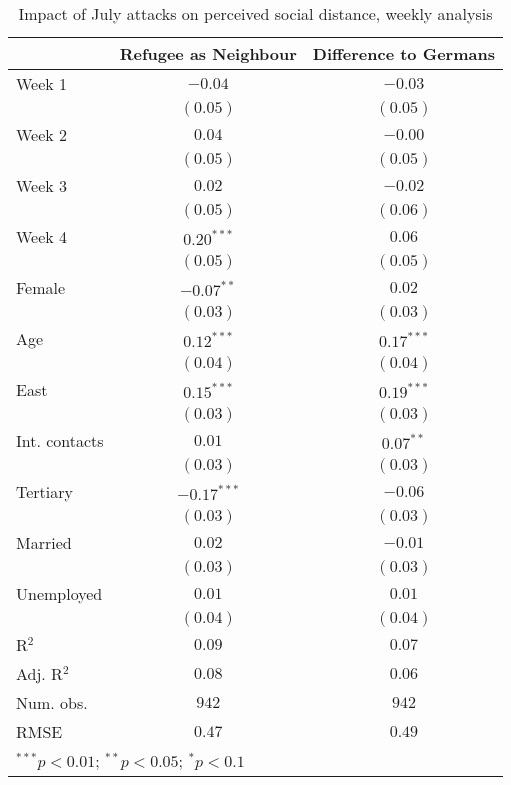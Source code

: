
\begin{table}
\caption{Impact of July attacks on perceived social distance, weekly analysis}
\begin{center}
\begin{tabular}{l c c}
\toprule
 & Refugee as Neighbour & Difference to Germans \\
\midrule
Week 1        & $-0.04$       & $-0.03$      \\
              & $(0.05)$      & $(0.05)$     \\
Week 2        & $0.04$        & $-0.00$      \\
              & $(0.05)$      & $(0.05)$     \\
Week 3        & $0.02$        & $-0.02$      \\
              & $(0.05)$      & $(0.06)$     \\
Week 4        & $0.20^{***}$  & $0.06$       \\
              & $(0.05)$      & $(0.05)$     \\
Female        & $-0.07^{**}$  & $0.02$       \\
              & $(0.03)$      & $(0.03)$     \\
Age           & $0.12^{***}$  & $0.17^{***}$ \\
              & $(0.04)$      & $(0.04)$     \\
East          & $0.15^{***}$  & $0.19^{***}$ \\
              & $(0.03)$      & $(0.03)$     \\
Int. contacts & $0.01$        & $0.07^{**}$  \\
              & $(0.03)$      & $(0.03)$     \\
Tertiary      & $-0.17^{***}$ & $-0.06$      \\
              & $(0.03)$      & $(0.03)$     \\
Married       & $0.02$        & $-0.01$      \\
              & $(0.03)$      & $(0.03)$     \\
Unemployed    & $0.01$        & $0.01$       \\
              & $(0.04)$      & $(0.04)$     \\
\midrule
R$^2$         & $0.09$        & $0.07$       \\
Adj. R$^2$    & $0.08$        & $0.06$       \\
Num. obs.     & $942$         & $942$        \\
RMSE          & $0.47$        & $0.49$       \\
\bottomrule
\multicolumn{3}{l}{\scriptsize{$^{***}p<0.01$; $^{**}p<0.05$; $^{*}p<0.1$}}
\end{tabular}
\label{tab_dist_week}
\end{center}
\end{table}
